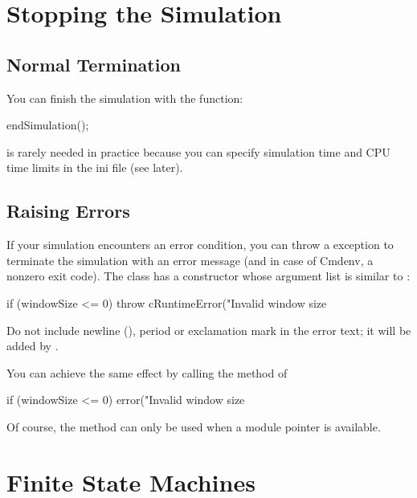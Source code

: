 \section{Stopping the Simulation}
\label{sec:simple-modules:stopping}

\subsection{Normal Termination}

You can finish the simulation with the  function:

\begin{cpp}
endSimulation();
\end{cpp}

 is rarely needed in practice because you
can specify simulation time and CPU time limits
in the ini file (see later).

\subsection{Raising Errors}

If your simulation encounters an error condition, you can throw a
 exception to terminate the simulation with
an error message (and in case of Cmdenv, a nonzero exit code).
The  class has a constructor whose argument list
is similar to :

\begin{cpp}
if (windowSize <= 0)
    throw cRuntimeError("Invalid window size %
\end{cpp}

Do not include newline (), period or exclamation mark
in the error text; it will be added by {\opp}.

You can achieve the same effect by calling the  method of

\begin{cpp}
if (windowSize <= 0)
    error("Invalid window size %
\end{cpp}

Of course, the  method can only be used when a module pointer
is available.



\section{Finite State Machines}
\label{sec:simple-modules:fsm}

